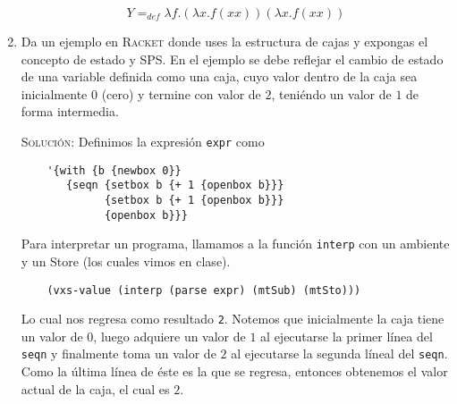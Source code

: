 \documentclass[letterpaper,11pt]{article}
\begin{document}
\begin{enumerate}
    \begin{equation*}
        Y =_{def} \lambda f.(\lambda x.f (xx)) (\lambda x.f (xx))
    \end{equation*}

    \item Da un ejemplo en \textsc{Racket} donde uses la estructura de cajas y
    expongas el concepto de estado y SPS. En el ejemplo se debe reflejar el 
    cambio de estado de una variable definida como una caja, cuyo valor dentro 
    de la caja sea inicialmente $0$ (cero) y termine con valor de $2$, teniéndo 
    un valor de $1$ de forma intermedia.

    \textsc{Solución:} Definimos la expresión \texttt{expr} como 
    \begin{verbatim}
    '{with {b {newbox 0}}
       {seqn {setbox b {+ 1 {openbox b}}}
             {setbox b {+ 1 {openbox b}}}
             {openbox b}}}
    \end{verbatim}
    
    Para interpretar un programa, llamamos a la función \texttt{interp} 
    con un ambiente y un Store (los cuales vimos en clase).
    \begin{verbatim}
    (vxs-value (interp (parse expr) (mtSub) (mtSto)))
    \end{verbatim}

    Lo cual nos regresa como resultado \texttt{2}. Notemos que inicialmente
    la caja tiene un valor de $0$, luego adquiere un valor de $1$ al ejecutarse 
    la primer línea del \texttt{seqn} y finalmente toma un valor de $2$ al 
    ejecutarse la segunda líneal del \texttt{seqn}. Como la última línea de 
    éste es la que se regresa, entonces obtenemos el valor actual de la caja, 
    el cual es $2$.
\end{enumerate}
\end{document}
